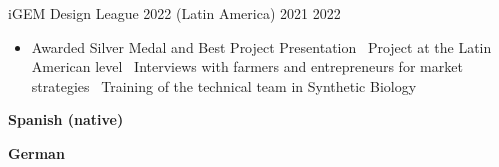 \documentclass{simplecv}
\newcommand{\mydot}{\raisebox{0.5 ex}{.}\ }
\begin{document}
    {iGEM Design League 2022 (Latin America)}
    {}
    {2021}
    {2022}
    {%
        \vspace{-11pt}
        \begin{itemize}[leftmargin=*]
        \setlength{\itemsep}{0cm}
          \item Awarded Silver Medal and Best Project Presentation \mydot Project at the Latin American level \mydot Interviews with farmers and entrepreneurs for market strategies \mydot Training of the technical team in Synthetic Biology
        \end{itemize}
    }
    
\newpage
\setlength\columnsep{0.33in}
\begin{multicols}{2}
\vspace{-8pt}
\textbf{Spanish (native)}\\

\medskip

\textbf{German}\\

\bigskip


\end{multicols}
\end{document}
